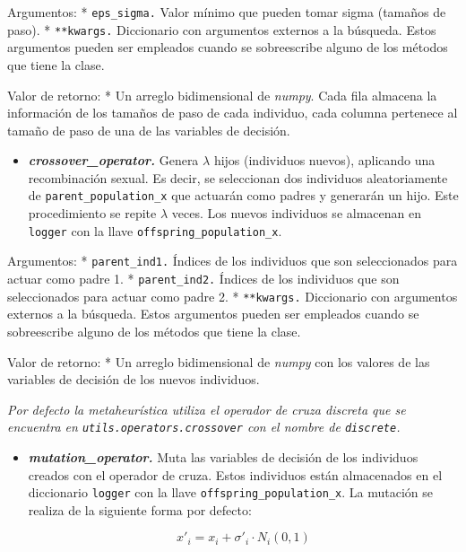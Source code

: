 \documentclass[11pt]{article}
\providecommand{\tightlist}{%
      \setlength{\itemsep}{0pt}\setlength{\parskip}{0pt}}
\begin{document}
Argumentos: * \texttt{eps\_sigma.} Valor mínimo que pueden tomar sigma
(tamaños de paso). * \texttt{**kwargs.} Diccionario con argumentos
externos a la búsqueda. Estos argumentos pueden ser empleados cuando se
sobreescribe alguno de los métodos que tiene la clase.

Valor de retorno: * Un arreglo bidimensional de \emph{numpy}. Cada fila
almacena la información de los tamaños de paso de cada individuo, cada
columna pertenece al tamaño de paso de una de las variables de decisión.

    \begin{itemize}
\tightlist
\item
  \emph{\textbf{crossover\_operator.}} Genera \(\lambda\) hijos
  (individuos nuevos), aplicando una recombinación sexual. Es decir, se
  seleccionan dos individuos aleatoriamente de
  \texttt{parent\_population\_x} que actuarán como padres y generarán un
  hijo. Este procedimiento se repite \(\lambda\) veces. Los nuevos
  individuos se almacenan en \texttt{logger} con la llave
  \texttt{offspring\_population\_x}.
\end{itemize}

Argumentos: * \texttt{parent\_ind1.} Índices de los individuos que son
seleccionados para actuar como padre 1. * \texttt{parent\_ind2.} Índices
de los individuos que son seleccionados para actuar como padre 2. *
\texttt{**kwargs.} Diccionario con argumentos externos a la búsqueda.
Estos argumentos pueden ser empleados cuando se sobreescribe alguno de
los métodos que tiene la clase.

Valor de retorno: * Un arreglo bidimensional de \emph{numpy} con los
valores de las variables de decisión de los nuevos individuos.

\emph{Por defecto la metaheurística utiliza el operador de cruza
discreta que se encuentra en \texttt{utils.operators.crossover} con el
nombre de \texttt{discrete}.}

    \begin{itemize}
\item
  \emph{\textbf{mutation\_operator.}} Muta las variables de decisión de
  los individuos creados con el operador de cruza. Estos individuos
  están almacenados en el diccionario \texttt{logger} con la llave
  \texttt{offspring\_population\_x}. La mutación se realiza de la
  siguiente forma por defecto:

  \begin{equation}
    \label{eq:mutarVariables}
    x'_i = x_i + \sigma'_i \cdot N_i(0, 1)
  \end{equation}
\end{itemize}
\end{document}
